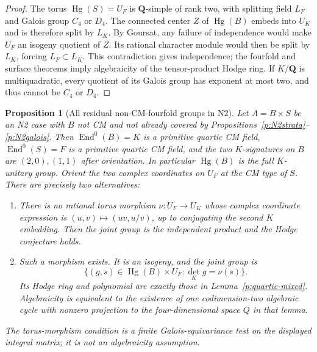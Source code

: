 \documentclass[10pt,reqno]{article}
\theoremstyle{emphasizedplain}
\newtheorem{proposition}[theorem]{Proposition}
\theoremstyle{emphasizeddefinition}
\theoremstyle{emphasizeddefinition}
\DeclareMathOperator{\End}{End}
\DeclareMathOperator{\Hg}{Hg}
\newcommand{\Q}{\mathbf Q}
\begin{document}
\begin{proof}
The torus $\Hg(S)=U_F$ is $\Q$-simple of rank two, with splitting
field $L_F$ and Galois group $C_4$ or $D_4$.
The connected center $Z$ of $\Hg(B)$ embeds into $U_K$ and is
therefore split by $L_K$. By Goursat, any failure of independence
would make $U_F$ an isogeny quotient of $Z$. Its rational character
module would then be split by $L_K$, forcing $L_F\subset L_K$.
This contradiction gives independence; the fourfold and surface
theorems imply algebraicity of the tensor-product Hodge ring.
If $K/\Q$ is multiquadratic, every quotient of its Galois group has
exponent at most two, and thus cannot be $C_4$ or $D_4$.
\end{proof}
\begin{proposition}[All residual non-CM-fourfold groups in N2]
\label{p:N2nonCMstructure}
Let $A=B\times S$ be an N2 case with $B$ not CM and not already
covered by Propositions~\ref{p:N2strata}--\ref{p:N2galois}.
Then $\End^0(B)=K$ is a primitive quartic CM field,
$\End^0(S)=F$ is a primitive quartic CM field, and the two
$K$-signatures on $B$ are $(2,0),(1,1)$ after orientation.
In particular $\Hg(B)$ is the full $K$-unitary group.
Orient the two complex coordinates on $U_F$ at the CM type of $S$.
There are precisely two alternatives:
\begin{enumerate}
\item There is no rational torus morphism $\nu:U_F\to U_K$
whose complex coordinate expression is $(u,v)\mapsto(uv,u/v)$,
up to conjugating the second $K$ embedding. Then the joint group
is the independent product and the Hodge conjecture holds.
\item Such a morphism exists. It is an isogeny, and the joint group is
\[
 \{(g,s)\in\Hg(B)\times U_F:\det_K g=\nu(s)\}.
\]
Its Hodge ring and polynomial are exactly those in
Lemma~\ref{p:quartic-mixed}. Algebraicity is equivalent to the
existence of one codimension-two algebraic cycle with nonzero
projection to the four-dimensional space $Q$ in that lemma.
\end{enumerate}
The torus-morphism condition is a finite Galois-equivariance test
on the displayed integral matrix; it is not an algebraicity assumption.
\end{proposition}
\end{document}
